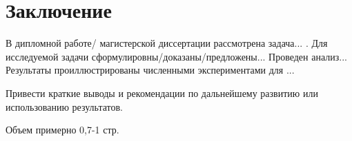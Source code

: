 \chapter*{Заключение}


В дипломной работе/ магистерской диссертации рассмотрена задача... . Для исследуемой задачи сформулировны/доказаны/предложены... Проведен анализ... Результаты проиллюстрированы численными экспериментами для ...

Привести краткие выводы и рекомендации по дальнейшему развитию или использованию результатов.

Объем примерно 0,7-1 стр.
 